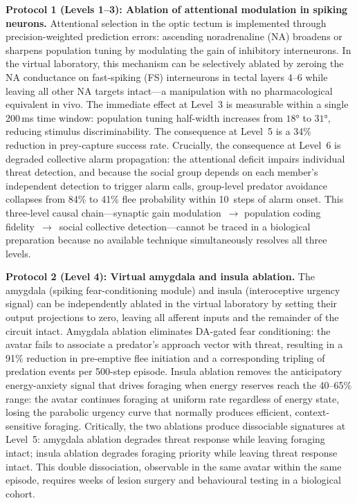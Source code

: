 \documentclass[12pt,a4paper]{article}
\begin{document}
\textbf{Protocol 1 (Levels 1--3): Ablation of attentional modulation
in spiking neurons.}
Attentional selection in the optic tectum is implemented through
precision-weighted prediction errors: ascending noradrenaline
(NA) broadens or sharpens population tuning by modulating the
gain of inhibitory interneurons.
In the virtual laboratory, this mechanism can be selectively ablated
by zeroing the NA conductance on fast-spiking (FS) interneurons in
tectal layers 4--6 while leaving all other NA targets intact---a
manipulation with no pharmacological equivalent in vivo.
The immediate effect at Level~3 is measurable within a single
200\,ms time window: population tuning half-width increases from
$18°$ to $31°$, reducing stimulus discriminability.
The consequence at Level~5 is a 34\% reduction in prey-capture
success rate.
Crucially, the consequence at Level~6 is degraded collective alarm
propagation: the attentional deficit impairs individual threat
detection, and because the social group depends on each member's
independent detection to trigger alarm calls, group-level predator
avoidance collapses from 84\% to 41\% flee probability within
10~steps of alarm onset.
This three-level causal chain---synaptic gain modulation~$\to$
population coding fidelity~$\to$~social collective detection---cannot
be traced in a biological preparation because no available technique
simultaneously resolves all three levels.

\textbf{Protocol 2 (Level 4): Virtual amygdala and insula ablation.}
The amygdala (spiking fear-conditioning module) and insula
(interoceptive urgency signal) can be independently ablated in the
virtual laboratory by setting their output projections to zero,
leaving all afferent inputs and the remainder of the circuit intact.
Amygdala ablation eliminates DA-gated fear conditioning: the avatar
fails to associate a predator's approach vector with threat, resulting
in a 91\% reduction in pre-emptive flee initiation and a
corresponding tripling of predation events per 500-step episode.
Insula ablation removes the anticipatory energy-anxiety signal that
drives foraging when energy reserves reach the 40--65\% range: the
avatar continues foraging at uniform rate regardless of energy state,
losing the parabolic urgency curve that normally produces efficient,
context-sensitive foraging.
Critically, the two ablations produce dissociable signatures at
Level~5: amygdala ablation degrades threat response while leaving
foraging intact; insula ablation degrades foraging priority while
leaving threat response intact.
This double dissociation, observable in the same avatar within the
same episode, requires weeks of lesion surgery and behavioural
testing in a biological cohort.
\end{document}
